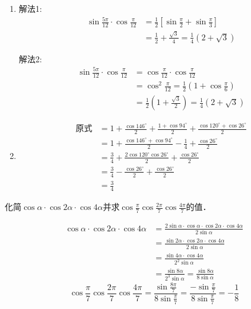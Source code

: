 \begin{solution}
\begin{enumerate}
    \item 解法1: 
\[\begin{split}
    \sin\frac{5\pi}{12}\cdot\cos\frac{\pi}{12}&=\frac{1}{2}\left[\sin\frac{\pi}{2}+\sin\frac{\pi}{3}\right]\\
    &=\frac{1}{2}+\frac{\sqrt{3}}{4}=\frac{1}{4}(2+\sqrt{3})
\end{split}\]    

解法2: 
\[\begin{split}
    \sin\frac{5\pi}{12}\cdot\cos\frac{\pi}{12}&=\cos\frac{\pi}{12}\cdot \cos\frac{\pi}{12}\\
    &=\cos^2\frac{\pi}{12}=\frac{1}{2}\left(1+\cos\frac{\pi}{6}\right)\\
    &=\frac{1}{2}\left(1+\frac{\sqrt{3}}{2}\right)=\frac{1}{4}\left(2+\sqrt{3}\right)
\end{split}\]    

\item \[\begin{split}
    \text{原式}&=1+\frac{\cos146^{\circ}}{2}+\frac{1+\cos94^{\circ}}{2}+\frac{\cos120^{\circ}+\cos26^{\circ}}{2}\\
    &=1+\frac{\cos146^{\circ}+\cos94^{\circ}}{2}-\frac{1}{4}+\frac{\cos26^{\circ}}{2}\\
    &=\frac{3}{4}+\frac{2\cos120^{\circ}\cos26^{\circ}}{2}+\frac{\cos26^{\circ}}{2}\\
    &=\frac{3}{4}-\frac{\cos26^{\circ}}{2}+\frac{\cos26^{\circ}}{2}\\
    &=\frac{3}{4}
\end{split}\]
\end{enumerate}
\end{solution}


\begin{example}
化简$\cos\alpha\cdot \cos2\alpha\cdot \cos4\alpha$并求$\cos\frac{\pi}{7}\cos\frac{2\pi}{7}\cos\frac{4\pi}{7}$的值．
\end{example}

\begin{solution}
\[\begin{split}
    \cos\alpha\cdot \cos2\alpha\cdot \cos4\alpha&=\frac{2\sin\alpha\cdot \cos\alpha\cdot \cos2\alpha\cdot \cos4\alpha}{2\sin\alpha}\\
    &=\frac{\sin2\alpha\cdot \cos2\alpha\cdot \cos4\alpha}{2\sin\alpha}\\
    &=\frac{\sin4\alpha\cdot \cos4\alpha}{2^2\sin\alpha}\\
    &=\frac{\sin8\alpha}{2^3\sin\alpha}=\frac{\sin 8\alpha}{8\sin \alpha}
\end{split}
\]
\[\cos\frac{\pi}{7}\cos\frac{2\pi}{7}\cos\frac{4\pi}{7}=\frac{\sin \frac{8\pi}{7}}{8\sin \frac{\pi}{7}}=\frac{-\sin\frac{\pi}{7}}{8\sin\frac{\pi}{7}}=-\frac{1}{8}\]
    
\end{solution}


